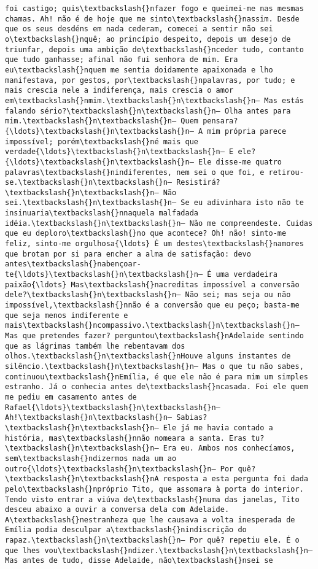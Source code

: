 \begin{Verbatim}[commandchars=\\\{\}]
foi castigo; quis\textbackslash{}nfazer fogo e queimei-me nas mesmas chamas. Ah! não é de hoje que me sinto\textbackslash{}nassim. Desde que os seus desdéns em nada cederam, comecei a sentir não sei o\textbackslash{}nquê; ao princípio despeito, depois um desejo de triunfar, depois uma ambição de\textbackslash{}nceder tudo, contanto que tudo ganhasse; afinal não fui senhora de mim. Era eu\textbackslash{}nquem me sentia doidamente apaixonada e lho manifestava, por gestos, por\textbackslash{}npalavras, por tudo; e mais crescia nele a indiferença, mais crescia o amor em\textbackslash{}nmim.\textbackslash{}n\textbackslash{}n— Mas estás falando sério?\textbackslash{}n\textbackslash{}n— Olha antes para mim.\textbackslash{}n\textbackslash{}n— Quem pensara?{\ldots}\textbackslash{}n\textbackslash{}n— A mim própria parece impossível; porém\textbackslash{}né mais que verdade{\ldots}\textbackslash{}n\textbackslash{}n— E ele?{\ldots}\textbackslash{}n\textbackslash{}n— Ele disse-me quatro palavras\textbackslash{}nindiferentes, nem sei o que foi, e retirou-se.\textbackslash{}n\textbackslash{}n— Resistirá?\textbackslash{}n\textbackslash{}n— Não sei.\textbackslash{}n\textbackslash{}n— Se eu adivinhara isto não te insinuaria\textbackslash{}nnaquela malfadada idéia.\textbackslash{}n\textbackslash{}n— Não me compreendeste. Cuidas que eu deploro\textbackslash{}no que acontece? Oh! não! sinto-me feliz, sinto-me orgulhosa{\ldots} É um destes\textbackslash{}namores que brotam por si para encher a alma de satisfação: devo antes\textbackslash{}nabençoar-te{\ldots}\textbackslash{}n\textbackslash{}n— É uma verdadeira paixão{\ldots} Mas\textbackslash{}nacreditas impossível a conversão dele?\textbackslash{}n\textbackslash{}n— Não sei; mas seja ou não impossível,\textbackslash{}nnão é a conversão que eu peço; basta-me que seja menos indiferente e mais\textbackslash{}ncompassivo.\textbackslash{}n\textbackslash{}n— Mas que pretendes fazer? perguntou\textbackslash{}nAdelaide sentindo que as lágrimas também lhe rebentavam dos olhos.\textbackslash{}n\textbackslash{}nHouve alguns instantes de silêncio.\textbackslash{}n\textbackslash{}n— Mas o que tu não sabes, continuou\textbackslash{}nEmília, é que ele não é para mim um simples estranho. Já o conhecia antes de\textbackslash{}ncasada. Foi ele quem me pediu em casamento antes de Rafael{\ldots}\textbackslash{}n\textbackslash{}n— Ah!\textbackslash{}n\textbackslash{}n— Sabias?\textbackslash{}n\textbackslash{}n— Ele já me havia contado a história, mas\textbackslash{}nnão nomeara a santa. Eras tu?\textbackslash{}n\textbackslash{}n— Era eu. Ambos nos conhecíamos, sem\textbackslash{}ndizermos nada um ao outro{\ldots}\textbackslash{}n\textbackslash{}n— Por quê?\textbackslash{}n\textbackslash{}nA resposta a esta pergunta foi dada pelo\textbackslash{}npróprio Tito, que assomara à porta do interior. Tendo visto entrar a viúva de\textbackslash{}numa das janelas, Tito desceu abaixo a ouvir a conversa dela com Adelaide. A\textbackslash{}nestranheza que lhe causava a volta inesperada de Emília podia desculpar a\textbackslash{}nindiscrição do rapaz.\textbackslash{}n\textbackslash{}n— Por quê? repetiu ele. É o que lhes vou\textbackslash{}ndizer.\textbackslash{}n\textbackslash{}n— Mas antes de tudo, disse Adelaide, não\textbackslash{}nsei se 
\end{Verbatim}
